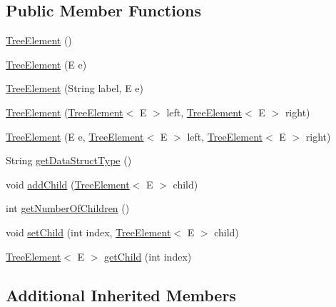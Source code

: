 \subsection*{Public Member Functions}
\begin{DoxyCompactItemize}
\item 
\hyperlink{classbridges_1_1base_1_1_tree_element_ab1af682e9304f5427e308ba5f43d7a9a}{Tree\+Element} ()
\item 
\hyperlink{classbridges_1_1base_1_1_tree_element_a0f17c278536239fb6cba051246ef67a8}{Tree\+Element} (E e)
\item 
\hyperlink{classbridges_1_1base_1_1_tree_element_a476cbeedf2c56f6a40a632035b7d740e}{Tree\+Element} (String label, E e)
\item 
\hyperlink{classbridges_1_1base_1_1_tree_element_aae24dfde287dc0596c69ad853f12f72e}{Tree\+Element} (\hyperlink{classbridges_1_1base_1_1_tree_element}{Tree\+Element}$<$ E $>$ left, \hyperlink{classbridges_1_1base_1_1_tree_element}{Tree\+Element}$<$ E $>$ right)
\item 
\hyperlink{classbridges_1_1base_1_1_tree_element_ace86faa0e65626833c61cc8418cfb1ed}{Tree\+Element} (E e, \hyperlink{classbridges_1_1base_1_1_tree_element}{Tree\+Element}$<$ E $>$ left, \hyperlink{classbridges_1_1base_1_1_tree_element}{Tree\+Element}$<$ E $>$ right)
\item 
String \hyperlink{classbridges_1_1base_1_1_tree_element_a5e0d5f8991d72bd7b0e76d6b0b8662a7}{get\+Data\+Struct\+Type} ()
\item 
void \hyperlink{classbridges_1_1base_1_1_tree_element_a473c29486e99edc725423941b203e939}{add\+Child} (\hyperlink{classbridges_1_1base_1_1_tree_element}{Tree\+Element}$<$ E $>$ child)
\item 
int \hyperlink{classbridges_1_1base_1_1_tree_element_a3722c7cec66ff297f999870df0da3cff}{get\+Number\+Of\+Children} ()
\item 
void \hyperlink{classbridges_1_1base_1_1_tree_element_aefafebb19d64398d150e464e4361ddf0}{set\+Child} (int index, \hyperlink{classbridges_1_1base_1_1_tree_element}{Tree\+Element}$<$ E $>$ child)
\item 
\hyperlink{classbridges_1_1base_1_1_tree_element}{Tree\+Element}$<$ E $>$ \hyperlink{classbridges_1_1base_1_1_tree_element_a4ee40d69ce52fdcac321554564d10aa3}{get\+Child} (int index)
\end{DoxyCompactItemize}
\subsection*{Additional Inherited Members}


